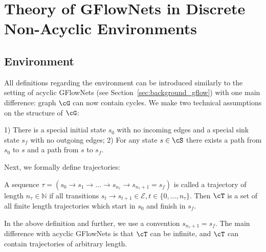 
\vspace{-0.2cm}
\section{Theory of GFlowNets in Discrete Non-Acyclic Environments}
\label{sec:construction}


\subsection{Environment}\label{sec:cyclic_env}
All definitions regarding the environment can be introduced similarly to the setting of acyclic GFlowNets (see Section~\ref{sec:background_gflow}) with one main difference: graph $\cG$ can now contain cycles. We make two technical assumptions on the structure of $\cG$:
\begin{assumption}
\label{assumption}
    1) There is a special initial state $s_0$ with no incoming edges and a special sink state $s_f$ with no outgoing edges; 2) For any state $s \in \cS$ there exists a path from $s_0$ to $s$ and a path from $s$ to $s_f$.
\end{assumption}


Next, we formally define trajectories:


\begin{definition}
\label{def:trajectory}
A sequence $\tau = (s_0 \to s_1 \to \ldots \to s_{n_{\tau}} \to s_{n_{\tau}+1} = s_f)$ is called a trajectory of length $n_{\tau} \in \mathbb{N}$ if all transitions $s_{t} \to s_{t+1} \in \mathcal{E}, t \in \{0,\ldots,n_{\tau}\}$. Then $\cT$ is a set of all finite length trajectories which start in $s_0$ and finish in $s_f$.
\end{definition}

\vspace{-0.1cm}
In the above definition and further, we use a convention $s_{n_{\tau} + 1} = s_f$. The main difference with acyclic GFlowNets is that $\cT$ can be infinite, and $\cT$ can contain trajectories of arbitrary length. 

